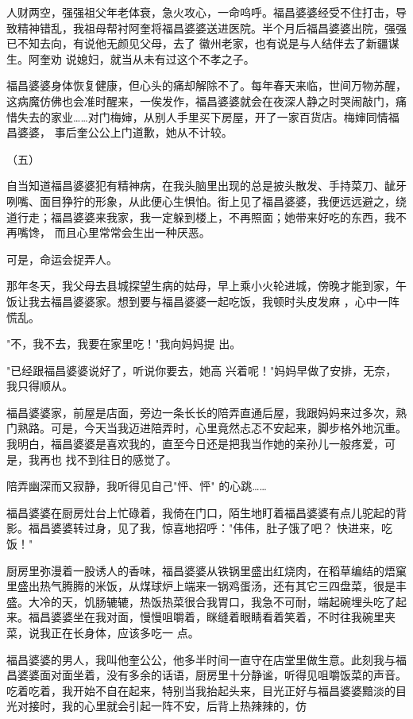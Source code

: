 \documentclass{article}
\begin{document}
人财两空，强强祖父年老体衰，急火攻心，一命呜呼。福昌婆婆经受不住打击，导致精神错乱，我祖母帮衬阿奎将福昌婆婆送进医院。半个月后福昌婆婆出院，强强已不知去向，有说他无颜见父母，去了
\newpage
徽州老家，也有说是与人结伴去了新疆谋生。阿奎劝
说媳妇，就当从未有过这个不孝之子。 

福昌婆婆身体恢复健康，但心头的痛却解除不了。每年春天来临，世间万物苏醒，这病魔仿佛也会准时醒来，一俟发作，福昌婆婆就会在夜深人静之时哭闹敲门，痛惜失去的家业……对门梅婶，从别人手里买下房屋，开了一家百货店。梅婶同情福昌婆婆，
事后奎公公上门道歉，她从不计较。 


（五） 

自当知道福昌婆婆犯有精神病，在我头脑里出现的总是披头散发、手持菜刀、龇牙咧嘴、面目狰狞的形象，从此便心生惧怕。街上见了福昌婆婆，我便远远避之，绕道行走；福昌婆婆来我家，我一定躲到楼上，不再照面；她带来好吃的东西，我不再嘴馋，
而且心里常常会生出一种厌恶。 


可是，命运会捉弄人。 

\newpage

那年冬天，我父母去县城探望生病的姑母，早上乘小火轮进城，傍晚才能到家，午饭让我去福昌婆婆家。想到要与福昌婆婆一起吃饭，我顿时头皮发麻
，心中一阵慌乱。 

"不，我不去，我要在家里吃！"我向妈妈提
出。 

"已经跟福昌婆婆说好了，听说你要去，她高
兴着呢！"妈妈早做了安排，无奈，我只得顺从。 

福昌婆婆家，前屋是店面，旁边一条长长的陪弄直通后屋，我跟妈妈来过多次，熟门熟路。可是，今天当我迈进陪弄时，心里竟然忐忑不安起来，脚步格外地沉重。我明白，福昌婆婆是喜欢我的，直至今日还是把我当作她的亲孙儿一般疼爱，可是，我再也
找不到往日的感觉了。 

陪弄幽深而又寂静，我听得见自己"怦、怦"
的心跳…… 

\newpage

福昌婆婆在厨房灶台上忙碌着，我倚在门口，陌生地盯着福昌婆婆有点儿驼起的背影。福昌婆婆转过身，见了我，惊喜地招呼："伟伟，肚子饿了吧？
快进来，吃饭！" 

厨房里弥漫着一股诱人的香味，福昌婆婆从铁锅里盛出红烧肉，在稻草编结的焐窠里盛出热气腾腾的米饭，从煤球炉上端来一锅鸡蛋汤，还有其它三四盘菜，很是丰盛。大冷的天，饥肠辘辘，热饭热菜很合我胃口，我急不可耐，端起碗埋头吃了起来。福昌婆婆坐在我对面，慢慢咀嚼着，眯缝着眼睛看着笑着，不时往我碗里夹菜，说我正在长身体，应该多吃一
点。 

福昌婆婆的男人，我叫他奎公公，他多半时间一直守在店堂里做生意。此刻我与福昌婆婆面对面坐着，没有多余的话语，厨房里十分静谧，听得见咀嚼饭菜的声音。吃着吃着，我开始不自在起来，特别当我抬起头来，目光正好与福昌婆婆黯淡的目光对接时，我的心里就会引起一阵不安，后背上热辣辣的，仿
\end{document}

